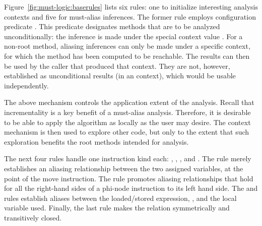 Figure~\ref{fig:must-logic:baserules} lists six rules: one to initialize interesting analysis contexts and five for must-alias inferences. The former rule employs configuration predicate . This predicate designates methods that are to be analyzed unconditionally: the inference is made under the special context value \ctxAll{}. For a non-root method, aliasing inferences can only be made under a specific context, for which the method has been computed to be reachable. The results can then be used by the caller that produced that context. They are not, however, established as unconditional results (in an \ctxAll{} context), which would be usable independently.

The above mechanism controls the application extent of the analysis. Recall that incrementality is a key benefit of a must-alias analysis. Therefore, it is desirable to be able to apply the algorithm as locally as the user may desire. The context mechanism is then used to explore other code, but only to the extent that such exploration benefits the root methods intended for analysis.

The next four  rules handle one instruction kind each: , , , and . The  rule merely establishes an aliasing relationship between the two assigned variables, at the point of the move instruction. The  rule promotes aliasing relationships that hold for all the right-hand sides of a phi-node instruction to its left hand side. The  and  rules establish aliases between the loaded/stored expression, , and the local variable used. Finally, the last  rule makes the  relation symmetrically and transitively closed.

